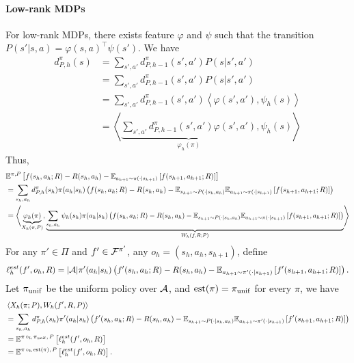 \paragraph{Low-rank MDPs} For low-rank MDPs, there exists feature $\varphi$ and $\psi$ such that the transition $P(s'|s,a) = \varphi(s,a)^\top \psi(s')$. We have 
\begin{align*}
    d_{P, h}^\pi(s) &= \sum_{s',a'} d_{P, h-1}^{\pi}(s',a') P(s|s', a')
    \\&= \sum_{s',a'} d_{P, h-1}^{\pi}(s',a') P(s|s', a')
    \\&= \sum_{s',a'} d_{P, h-1}^{\pi}(s',a') \left\langle \varphi(s',a'), \psi_h(s)\right\rangle
    \\&= \left\langle \underbrace{\sum_{s',a'} d_{P, h-1}^{\pi}(s',a')\varphi(s',a')}_{\varphi_h(\pi)}, \psi_h(s)\right\rangle
 \end{align*}
 Thus, 
 \begin{align*}
     &\E^{\pi, P}\left[f(s_h, a_h; R) - R(s_h, a_h) - \E_{a_{h+1} \sim \pi(\cdot|s_{h+1})}\left[f(s_{h+1}, a_{h+1}; R)\right]\right]
     \\&= \sum_{s_h,a_h} d_{P, h}^\pi(s_h)\pi(a_h|s_h)\left(f(s_h, a_h; R) - R(s_h, a_h) - \E_{s_{h+1} \sim P(\cdot|s_h, a_h)}\E_{a_{h+1} \sim \pi(\cdot|s_{h+1})}\left[f(s_{h+1}, a_{h+1}; R)\right]\right)
     \\&= \scalebox{0.95}{$\displaystyle\left\langle \underbrace{\varphi_h(\pi)}_{X_h(\pi, P)}, 
     \underbrace{\sum_{s_h, a_h} \psi_h(s_h)\pi(a_h|s_h)\left(f(s_h, a_h; R) - R(s_h, a_h) - \E_{s_{h+1} \sim P(\cdot|s_h, a_h)}\E_{a_{h+1} \sim \pi(\cdot|s_{h+1})}\left[f(s_{h+1}, a_{h+1}; R)\right]\right)}_{W_h(f, R; P)}\right\rangle $}
 \end{align*}
For any $\pi' \in \Pi$ and $f' \in \mathcal{F}^{\pi'}$, any $o_h = (s_h, a_h, s_{h+1})$, define $$\ell^{est}_h(f', o_h, R) = |\mathcal{A}| \pi'(a_h|s_h)\left(f'(s_h, a_h; R) - R(s_h, a_h) - \mathbb{E}_{a_{h+1} \sim \pi'(\cdot|s_{h+1})}\left[f'(s_{h+1}, a_{h+1}; R)\right]\right).$$
Let $\pi_{\operatorname*{unif}}$ be the uniform policy over $\mathcal{A}$, and $\operatorname*{est}(\pi) = \pi_{\operatorname*{unif}}$ for every $\pi$, we have
\begin{align*}
    &\left\langle X_h(\pi; P), W_h(f', R, P)\right\rangle
    \\&= \sum_{s_h,a_h} d_{P, h}^\pi(s_h)\pi'(a_h|s_h)\left(f'(s_h, a_h; R) - R(s_h, a_h) - \mathbb{E}_{s_{h+1} \sim P(\cdot|s_h, a_h)}\mathbb{E}_{a_{h+1} \sim \pi'(\cdot|s_{h+1})}\left[f'(s_{h+1}, a_{h+1}; R)\right]\right)
    \\&= \mathbb{E}^{\pi\, \circ_h\, \pi_{\operatorname*{unif}},\, P}\left[\ell^{est}_h(f', o_h, R)\right]
     \\&= \mathbb{E}^{\pi\, \circ_h\, \operatorname*{est}(\pi),\, P}\left[\ell^{est}_h(f', o_h, R)\right].
\end{align*}
